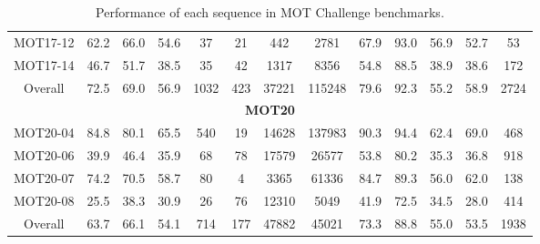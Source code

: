 \begin{table*}[t!]
\begin{tabular}{c|cccccccccccc}
         MOT17-12 & 62.2 & 66.0 & 54.6 & 37 & 21 & 442 & 2781 & 67.9 & 93.0 & 56.9 & 52.7 & 53\\
         MOT17-14 & 46.7 & 51.7 & 38.5 & 35 & 42 & 1317 & 8356 & 54.8 & 88.5 & 38.9 & 38.6 & 172 \\
         Overall & 72.5 & 69.0 & 56.9  & 1032 & 423 & 37221 & 115248 & 79.6 & 92.3 & 55.2 & 58.9 & 2724  \\\hline
         \multicolumn{13}{c}{\textbf{MOT20} \cite{dendorfer2020mot20}} \\\hline\hline
        MOT20-04& 84.8 & 80.1 & 65.5 & 540 & 19& 14628 & 137983 & 90.3 & 94.4 & 62.4 & 69.0 & 468\\
        MOT20-06 & 39.9 & 46.4 & 35.9 & 68 & 78 & 17579 & 26577 & 53.8 & 80.2 & 35.3 & 36.8 & 918\\
        MOT20-07 & 74.2 & 70.5 & 58.7 & 80 & 4 & 3365 & 61336 & 84.7 & 89.3 & 56.0 & 62.0 & 138\\
        MOT20-08 & 25.5 & 38.3 & 30.9 & 26 & 76 & 12310 & 5049 & 41.9 & 72.5& 34.5 & 28.0 & 414\\
        Overall & 63.7 & 66.1 & 54.1 & 714 & 177 & 47882 & 45021 & 73.3 & 88.8 & 55.0& 53.5 & 1938\\\hline
    \bottomrule[1.5pt]
    \end{tabular}
 \vspace{-2.0mm}
    \caption{Performance of each sequence in MOT Challenge benchmarks.}
    \label{tab:MOTexp_seq}
    \vspace{-1.5mm}
\end{table*}